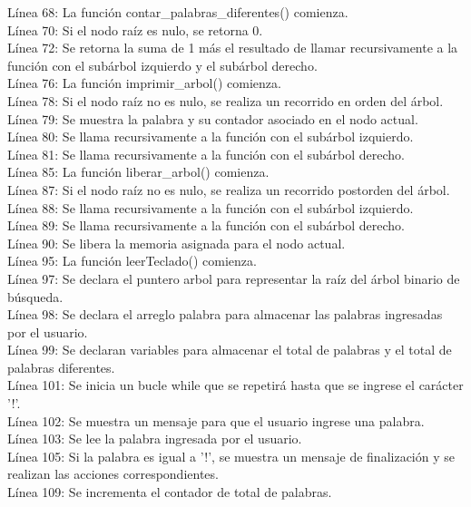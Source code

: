 \documentclass[]{article}
\begin{document}
Línea 68: La función contar\_palabras\_diferentes() comienza.\\
Línea 70: Si el nodo raíz es nulo, se retorna 0.\\
Línea 72: Se retorna la suma de 1 más el resultado de llamar recursivamente a la función con el subárbol izquierdo y el subárbol derecho.\\
Línea 76: La función imprimir\_arbol() comienza.\\
Línea 78: Si el nodo raíz no es nulo, se realiza un recorrido en orden del árbol.\\
Línea 79: Se muestra la palabra y su contador asociado en el nodo actual.\\
Línea 80: Se llama recursivamente a la función con el subárbol izquierdo.\\
Línea 81: Se llama recursivamente a la función con el subárbol derecho.\\
Línea 85: La función liberar\_arbol() comienza.\\
Línea 87: Si el nodo raíz no es nulo, se realiza un recorrido postorden del árbol.\\
Línea 88: Se llama recursivamente a la función con el subárbol izquierdo.\\
Línea 89: Se llama recursivamente a la función con el subárbol derecho.\\
Línea 90: Se libera la memoria asignada para el nodo actual.\\
Línea 95: La función leerTeclado() comienza.\\
Línea 97: Se declara el puntero arbol para representar la raíz del árbol binario de búsqueda.\\
Línea 98: Se declara el arreglo palabra para almacenar las palabras ingresadas por el usuario.\\
Línea 99: Se declaran variables para almacenar el total de palabras y el total de palabras diferentes.\\
Línea 101: Se inicia un bucle while que se repetirá hasta que se ingrese el carácter '!'.\\
Línea 102: Se muestra un mensaje para que el usuario ingrese una palabra.\\
Línea 103: Se lee la palabra ingresada por el usuario.\\
Línea 105: Si la palabra es igual a '!', se muestra un mensaje de finalización y se realizan las acciones correspondientes.\\
Línea 109: Se incrementa el contador de total de palabras.\\
\end{document}
